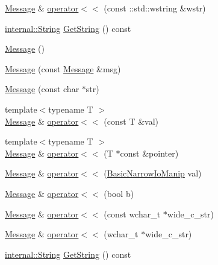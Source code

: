 \begin{DoxyCompactItemize}
\item 
\hyperlink{classtesting_1_1Message}{\-Message} \& \hyperlink{classtesting_1_1Message_ae80d93e0ba4639706a75e380502768fd}{operator$<$$<$} (const \-::std\-::wstring \&wstr)
\item 
\hyperlink{classtesting_1_1internal_1_1String}{internal\-::\-String} \hyperlink{classtesting_1_1Message_af55933eccabbde1324138372e94520ad}{\-Get\-String} () const 
\item 
\hyperlink{classtesting_1_1Message_af1991e0448f9277f0939d142e4aa2c94}{\-Message} ()
\item 
\hyperlink{classtesting_1_1Message_a88a351ea6cb0a42238744a6565ab665f}{\-Message} (const \hyperlink{classtesting_1_1Message}{\-Message} \&msg)
\item 
\hyperlink{classtesting_1_1Message_ad39663bd5560bdd7033a30d085afd759}{\-Message} (const char $\ast$str)
\item 
{\footnotesize template$<$typename T $>$ }\\\hyperlink{classtesting_1_1Message}{\-Message} \& \hyperlink{classtesting_1_1Message_a173f6d370f2730877bbf104ceb93f461}{operator$<$$<$} (const \-T \&val)
\item 
{\footnotesize template$<$typename T $>$ }\\\hyperlink{classtesting_1_1Message}{\-Message} \& \hyperlink{classtesting_1_1Message_ae41772c43713f4bbc704c8b3f0648839}{operator$<$$<$} (\-T $\ast$const \&pointer)
\item 
\hyperlink{classtesting_1_1Message}{\-Message} \& \hyperlink{classtesting_1_1Message_a2cf5e79015eff3c525bad5758bb7c873}{operator$<$$<$} (\hyperlink{classtesting_1_1Message_ae41100e7f6db1696cd6282c56c1528b3}{\-Basic\-Narrow\-Io\-Manip} val)
\item 
\hyperlink{classtesting_1_1Message}{\-Message} \& \hyperlink{classtesting_1_1Message_a905ea03f1daecb48aa6e89e7f2c61673}{operator$<$$<$} (bool b)
\item 
\hyperlink{classtesting_1_1Message}{\-Message} \& \hyperlink{classtesting_1_1Message_ae6963b96f86950ded481a92a81e19ea0}{operator$<$$<$} (const wchar\-\_\-t $\ast$wide\-\_\-c\-\_\-str)
\item 
\hyperlink{classtesting_1_1Message}{\-Message} \& \hyperlink{classtesting_1_1Message_a1ce1e8502319779d5a2778214d460f3d}{operator$<$$<$} (wchar\-\_\-t $\ast$wide\-\_\-c\-\_\-str)
\item 
\hyperlink{classtesting_1_1internal_1_1String}{internal\-::\-String} \hyperlink{classtesting_1_1Message_af55933eccabbde1324138372e94520ad}{\-Get\-String} () const 
\end{DoxyCompactItemize}
